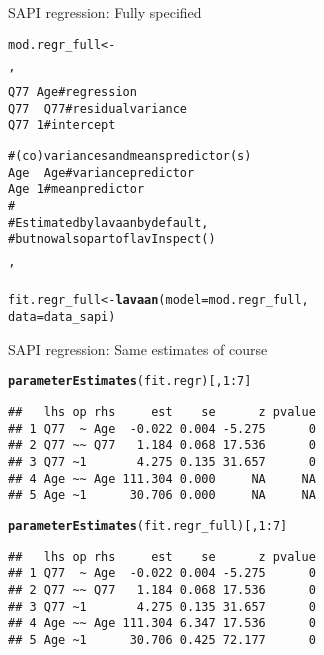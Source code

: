 \documentclass[10pt]{beamer}\usepackage[]{graphicx}\usepackage[]{xcolor}
\makeatletter
\newcommand{\hlnum}[1]{\textcolor[rgb]{0.686,0.059,0.569}{#1}}%
\newcommand{\hlsng}[1]{\textcolor[rgb]{0.192,0.494,0.8}{#1}}%
\newcommand{\hlopt}[1]{\textcolor[rgb]{0,0,0}{#1}}%
\newcommand{\hldef}[1]{\textcolor[rgb]{0.345,0.345,0.345}{#1}}%
\newcommand{\hlkwb}[1]{\textcolor[rgb]{0.69,0.353,0.396}{#1}}%
\newcommand{\hlkwc}[1]{\textcolor[rgb]{0.333,0.667,0.333}{#1}}%
\newcommand{\hlkwd}[1]{\textcolor[rgb]{0.737,0.353,0.396}{\textbf{#1}}}%
\newenvironment{kframe}{%
 \def\at@end@of@kframe{}%
 \ifinner\ifhmode%
  \def\at@end@of@kframe{\end{minipage}}%
  \begin{minipage}{\columnwidth}%
 \fi\fi%
 \def\FrameCommand##1{\hskip\@totalleftmargin \hskip-\fboxsep
 \colorbox{shadecolor}{##1}\hskip-\fboxsep
     \hskip-\linewidth \hskip-\@totalleftmargin \hskip\columnwidth}%
 \MakeFramed {\advance\hsize-\width
   \@totalleftmargin\z@ \linewidth\hsize
   \@setminipage}}%
 {\par\unskip\endMakeFramed%
 \at@end@of@kframe}
\newenvironment{knitrout}{}{} %
\makeatother
\begin{document}
%
\begin{frame}[fragile]{SAPI regression: Fully specified}

\begin{knitrout}
\color{fgcolor}\begin{kframe}
\begin{alltt}
\hldef{mod.regr_full} \hlkwb{<-} \hlsng{'
  Q77 ~  Age # regression
  Q77 ~~ Q77 # residual variance
  Q77 ~  1   # intercept
  
  # (co)variances and means predictor(s)
  Age ~~ Age # variance predictor
  Age ~ 1    # mean predictor
  #
  # Estimated by lavaan by default, 
  # but now also part of lavInspect()
  
'}
\hldef{fit.regr_full} \hlkwb{<-} \hlkwd{lavaan}\hldef{(}\hlkwc{model} \hldef{= mod.regr_full,}
                         \hlkwc{data} \hldef{= data_sapi)}
\end{alltt}
\end{kframe}
\end{knitrout}

\end{frame}
%
\begin{frame}[fragile]{SAPI regression: Same estimates of course}

\begin{knitrout}
\color{fgcolor}\begin{kframe}
\begin{alltt}
\hlkwd{parameterEstimates}\hldef{(fit.regr)[,}\hlnum{1}\hlopt{:}\hlnum{7}\hldef{]}
\end{alltt}
\begin{verbatim}
##   lhs op rhs     est    se      z pvalue
## 1 Q77  ~ Age  -0.022 0.004 -5.275      0
## 2 Q77 ~~ Q77   1.184 0.068 17.536      0
## 3 Q77 ~1       4.275 0.135 31.657      0
## 4 Age ~~ Age 111.304 0.000     NA     NA
## 5 Age ~1      30.706 0.000     NA     NA
\end{verbatim}
\end{kframe}
\end{knitrout}

\begin{knitrout}
\color{fgcolor}\begin{kframe}
\begin{alltt}
\hlkwd{parameterEstimates}\hldef{(fit.regr_full)[,}\hlnum{1}\hlopt{:}\hlnum{7}\hldef{]}
\end{alltt}
\begin{verbatim}
##   lhs op rhs     est    se      z pvalue
## 1 Q77  ~ Age  -0.022 0.004 -5.275      0
## 2 Q77 ~~ Q77   1.184 0.068 17.536      0
## 3 Q77 ~1       4.275 0.135 31.657      0
## 4 Age ~~ Age 111.304 6.347 17.536      0
## 5 Age ~1      30.706 0.425 72.177      0
\end{verbatim}
\end{kframe}
\end{knitrout}
\end{frame}
\end{document}

